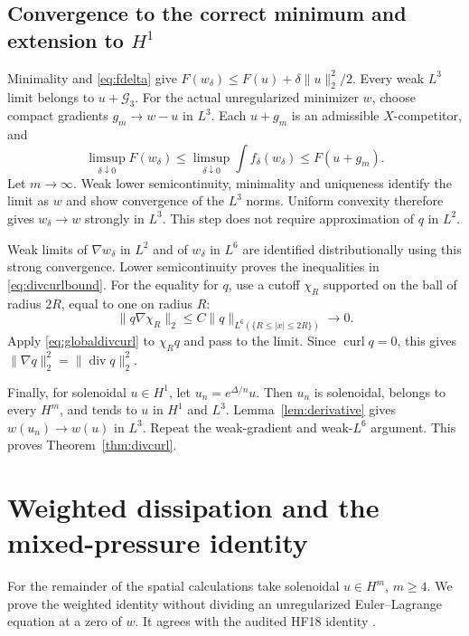 \documentclass[11pt,a4paper]{article}
\theoremstyle{definition}
\theoremstyle{remark}
\newcommand{\G}{\mathcal G_3}
\newcommand{\norm}[1]{\lVert #1\rVert}
\newcommand{\diver}{\operatorname{div}}
\newcommand{\curl}{\operatorname{curl}}
\numberwithin{equation}{section}
\begin{document}
\subsection{Convergence to the correct minimum and extension to \texorpdfstring{\(H^1\)}{H1}}
Minimality and \eqref{eq:fdelta} give \(F(w_\delta)\le F(u)+\delta\norm u_2^2/2\). Every weak \(L^3\) limit belongs to \(u+\G\). For the actual unregularized minimizer \(w\), choose compact gradients \(g_m\to w-u\) in \(L^3\). Each \(u+g_m\) is an admissible \(X\)-competitor, and
\[
\limsup_{\delta\downarrow0}F(w_\delta)
\le\limsup_{\delta\downarrow0}\int f_\delta(w_\delta)
\le F(u+g_m).
\]
Let \(m\to\infty\). Weak lower semicontinuity, minimality and uniqueness identify the limit as \(w\) and show convergence of the \(L^3\) norms. Uniform convexity therefore gives \(w_\delta\to w\) strongly in \(L^3\). This step does not require approximation of \(q\) in \(L^2\).

Weak limits of \(\nabla w_\delta\) in \(L^2\) and of \(w_\delta\) in \(L^6\) are identified distributionally using this strong convergence. Lower semicontinuity proves the inequalities in \eqref{eq:divcurlbound}. For the equality for \(q\), use a cutoff \(\chi_R\) supported on the ball of radius \(2R\), equal to one on radius \(R\):
\[
\norm{q\nabla\chi_R}_2\le C\norm q_{L^6(\{R\le|x|\le2R\})}\longrightarrow0.
\]
Apply \eqref{eq:globaldivcurl} to \(\chi_Rq\) and pass to the limit. Since \(\curl q=0\), this gives \(\norm{\nabla q}_2^2=\norm{\diver q}_2^2\).

Finally, for solenoidal \(u\in H^1\), let \(u_n=e^{\Delta/n}u\). Then \(u_n\) is solenoidal, belongs to every \(H^m\), and tends to \(u\) in \(H^1\) and \(L^3\). Lemma~\ref{lem:derivative} gives \(w(u_n)\to w(u)\) in \(L^3\). Repeat the weak-gradient and weak-\(L^6\) argument. This proves Theorem~\ref{thm:divcurl}.

\section{Weighted dissipation and the mixed-pressure identity}\label{sec:weighted}
For the remainder of the spatial calculations take solenoidal \(u\in H^m\), \(m\ge4\). We prove the weighted identity without dividing an unregularized Euler--Lagrange equation at a zero of \(w\). It agrees with the audited HF18 identity \cite{Research}.
\end{document}
